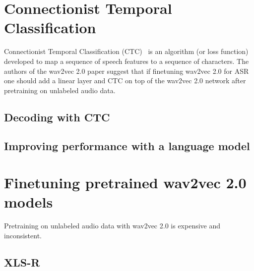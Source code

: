 \section{Connectionist Temporal Classification}
Connectionist Temporal Classification (CTC)~\cite{graves2006connectionist} is an algorithm (or loss function) 
developed to map a sequence of speech features to a sequence of characters. The authors of the wav2vec 2.0 paper
suggest that if finetuning wav2vec 2.0 for ASR one should add a linear layer and CTC on top of the wav2vec 2.0 
network after pretraining on unlabeled audio data.



\subsection{Decoding with CTC}



\subsection{Improving performance with a language model}



\section{Finetuning pretrained wav2vec 2.0 models}
Pretraining on unlabeled audio data with wav2vec 2.0 is expensive and inconsistent.



\subsection{XLS-R}
